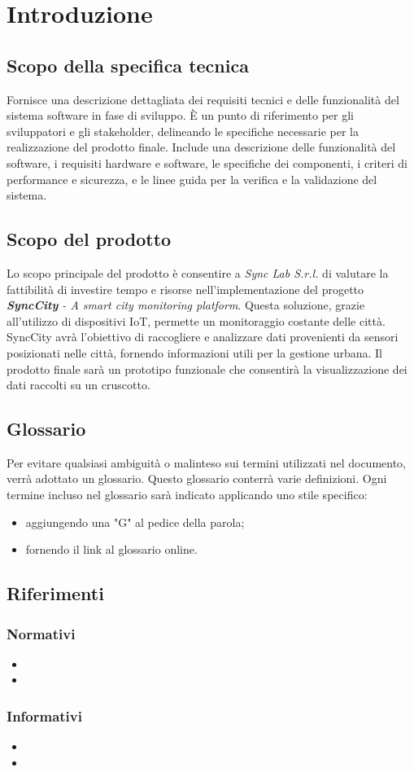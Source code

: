 \section{Introduzione}
\setcounter{subsection}{0}
\subsection{Scopo della specifica tecnica} 
Fornisce una descrizione dettagliata dei requisiti tecnici e delle funzionalità del sistema software in fase di sviluppo. È un punto di riferimento per gli sviluppatori e gli stakeholder, delineando le specifiche necessarie per la realizzazione del prodotto finale. Include una descrizione delle funzionalità del software, i requisiti hardware e software, le specifiche dei componenti, i criteri di performance e sicurezza, e le linee guida per la verifica e la validazione del sistema.

\subsection{Scopo del prodotto}
Lo scopo principale del prodotto è consentire a \textit{Sync Lab S.r.l.} di valutare la fattibilità di investire tempo e risorse nell’implementazione del progetto \textit{\textbf{SyncCity} - A smart city monitoring platform}. Questa soluzione, grazie all’utilizzo di dispositivi IoT, permette un monitoraggio costante delle città. SyncCity avrà l’obiettivo di raccogliere e analizzare dati provenienti da sensori posizionati nelle città, fornendo informazioni utili per la gestione urbana. Il prodotto finale sarà un prototipo funzionale che consentirà la visualizzazione dei dati raccolti su un cruscotto.

\subsection{Glossario}
Per evitare qualsiasi ambiguità o malinteso sui termini utilizzati nel documento, verrà adottato un glossario. Questo glossario conterrà varie definizioni. Ogni termine incluso nel glossario sarà indicato applicando uno stile specifico:
\begin{itemize}
    \item aggiungendo una "G" al pedice della parola;
    \item fornendo il link al glossario online.
\end{itemize}

\subsection{Riferimenti}
\subsubsection{Normativi} %
\begin{itemize}
    \item 
    \item 
\end{itemize}
\subsubsection{Informativi}
\begin{itemize} %
    \item 
    \item 
\end{itemize}
